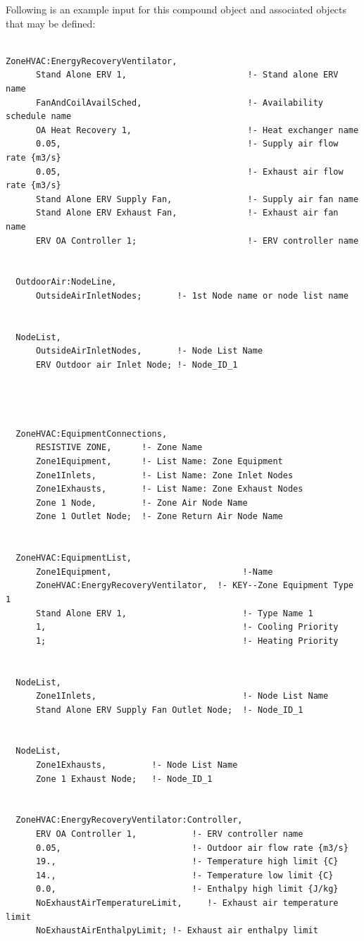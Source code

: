 Following is an example input for this compound object and associated objects that may be defined:

\begin{lstlisting}

ZoneHVAC:EnergyRecoveryVentilator,
      Stand Alone ERV 1,                        !- Stand alone ERV name
      FanAndCoilAvailSched,                     !- Availability schedule name
      OA Heat Recovery 1,                       !- Heat exchanger name
      0.05,                                     !- Supply air flow rate {m3/s}
      0.05,                                     !- Exhaust air flow rate {m3/s}
      Stand Alone ERV Supply Fan,               !- Supply air fan name
      Stand Alone ERV Exhaust Fan,              !- Exhaust air fan name
      ERV OA Controller 1;                      !- ERV controller name


  OutdoorAir:NodeLine,
      OutsideAirInletNodes;       !- 1st Node name or node list name


  NodeList,
      OutsideAirInletNodes,       !- Node List Name
      ERV Outdoor air Inlet Node; !- Node_ID_1




  ZoneHVAC:EquipmentConnections,
      RESISTIVE ZONE,      !- Zone Name
      Zone1Equipment,      !- List Name: Zone Equipment
      Zone1Inlets,         !- List Name: Zone Inlet Nodes
      Zone1Exhausts,       !- List Name: Zone Exhaust Nodes
      Zone 1 Node,         !- Zone Air Node Name
      Zone 1 Outlet Node;  !- Zone Return Air Node Name


  ZoneHVAC:EquipmentList,
      Zone1Equipment,                          !-Name
      ZoneHVAC:EnergyRecoveryVentilator,  !- KEY--Zone Equipment Type 1
      Stand Alone ERV 1,                       !- Type Name 1
      1,                                       !- Cooling Priority
      1;                                       !- Heating Priority


  NodeList,
      Zone1Inlets,                             !- Node List Name
      Stand Alone ERV Supply Fan Outlet Node;  !- Node_ID_1


  NodeList,
      Zone1Exhausts,         !- Node List Name
      Zone 1 Exhaust Node;   !- Node_ID_1


  ZoneHVAC:EnergyRecoveryVentilator:Controller,
      ERV OA Controller 1,           !- ERV controller name
      0.05,                          !- Outdoor air flow rate {m3/s}
      19.,                           !- Temperature high limit {C}
      14.,                           !- Temperature low limit {C}
      0.0,                           !- Enthalpy high limit {J/kg}
      NoExhaustAirTemperatureLimit,     !- Exhaust air temperature limit
      NoExhaustAirEnthalpyLimit; !- Exhaust air enthalpy limit





\end{lstlisting}
